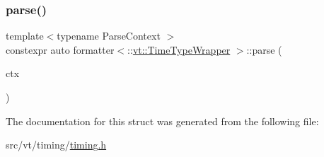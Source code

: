 \mbox{\label{structformatter_3_1_1vt_1_1_time_type_wrapper_01_4_a44dee4370ae49f065cf791cac1d974b0}} 
\subsubsection{\texorpdfstring{parse()}{parse()}}
{\footnotesize\ttfamily template$<$typename Parse\+Context $>$ \\
constexpr auto formatter$<$\+::\hyperlink{structvt_1_1_time_type_wrapper}{vt\+::\+Time\+Type\+Wrapper} $>$\+::parse (\begin{DoxyParamCaption}\item[{Parse\+Context \&}]{ctx }\end{DoxyParamCaption})\hspace{0.3cm}{\ttfamily [inline]}}



The documentation for this struct was generated from the following file\+:\begin{DoxyCompactItemize}
\item 
src/vt/timing/\hyperlink{timing_8h}{timing.\+h}\end{DoxyCompactItemize}
